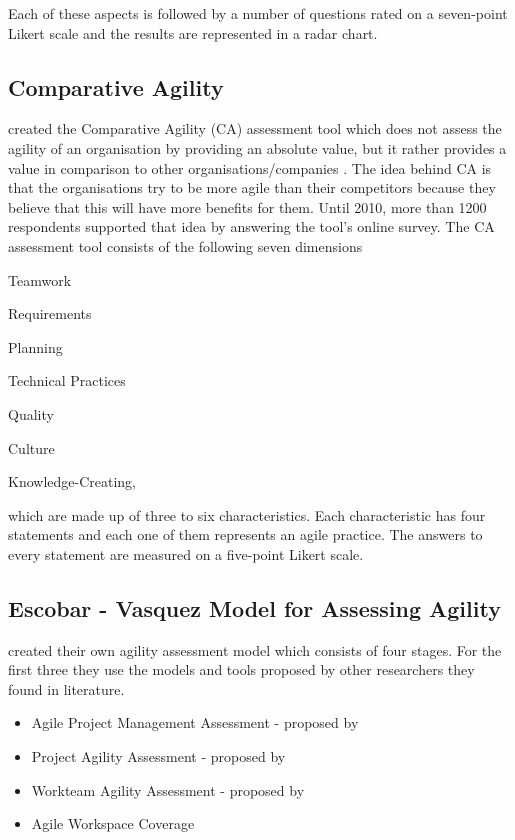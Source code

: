 Each of these aspects is followed by a number of questions rated on a seven-point Likert scale and the results are represented in a radar chart.

\subsection{Comparative Agility} %
\citet{comparative_agility} created the Comparative Agility (CA) assessment tool which does not assess the agility of an organisation by providing an absolute value, but it rather provides a value in comparison to other organisations/companies \cite{comparative_agility_web}. The idea behind CA is that the organisations try to be more agile than their competitors because they believe that this will have more benefits for them. Until 2010, more than 1200 respondents supported that idea by answering the tool's online survey. The CA assessment tool consists of the following seven dimensions
\begin{inparaenum} [a\upshape)]
	\item Teamwork
	\item Requirements
	\item Planning
	\item Technical Practices
	\item Quality
	\item Culture
	\item Knowledge-Creating,
\end{inparaenum}
which are made up of three to six characteristics. Each characteristic has four statements and each one of them represents an agile practice. The answers to every statement are measured on a five-point Likert scale.

\subsection{Escobar - Vasquez Model for Assessing Agility} %

\citet{6427226} created their own agility assessment model which consists of four stages. For the first three they use the models and tools proposed by other researchers they found in literature.
\begin{itemize}
\item Agile Project Management Assessment - proposed by \citet{qumer2006measuring}
\item Project Agility Assessment - proposed by \citet{taylor}
\item Workteam Agility Assessment - proposed by \citet{Leffingwell}
\item Agile Workspace Coverage
\end{itemize}

